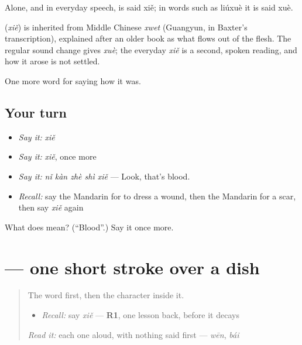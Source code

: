 Alone, and in everyday speech,  is said xiě; in words such as liúxuè it is said xuè.

\begin{cousinweb}
\textbf{} (\emph{xiě}) is inherited from Middle Chinese \emph{xwet} (Guangyun, in Baxter's transcription), explained after an older book as what flows out of the flesh. The regular sound change gives \emph{xuè}; the everyday \emph{xiě} is a second, spoken reading, and how it arose is not settled.
\end{cousinweb}

\begin{grammarlens}[title={What you've built}]
One more word for saying how it was.
\end{grammarlens}

\subsection*{Your turn}
\begin{itemize}
\raggedright
  \item \emph{Say it:} \emph{xiě}
  \item \emph{Say it:} \emph{xiě}, once more
  \item \emph{Say it:} \emph{nǐ kàn zhè shì xiě} — Look, that's blood.
  \item \emph{Recall:} say the Mandarin for to dress a wound, then the Mandarin for a scar, then say \emph{xiě} again
\end{itemize}

\begin{tcolorbox}[breakable,colback=teal!4,colframe=teal!35!black,title={Before you move on}]
What does  mean? (\textquotedblleft{}Blood\textquotedblright{}.) Say it once more.
\end{tcolorbox}
\section[\texorpdfstring{\zh{血} (xiě)}{血 (xiě)}]{ — one short stroke over a dish}

\label{lesson:ZH-W479-xie-blood}



\begin{quote}
The word first, then the character inside it.

\begin{itemize}
\raggedright
  \item \emph{Recall:} say \emph{xiě} — \textbf{R1}, one lesson back, before it decays
\end{itemize}

\begin{quote}
 
\end{quote}

\emph{Read it:} each one aloud, with nothing said first — \emph{wēn}, \emph{bái}
\end{quote}

